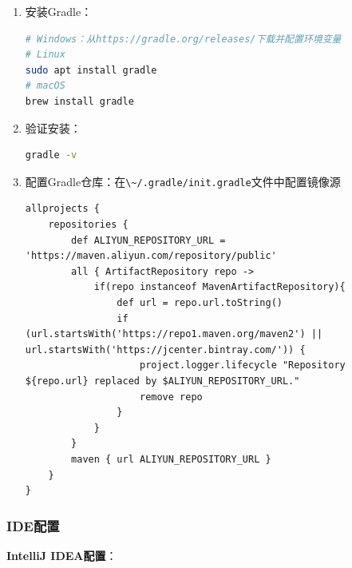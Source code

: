 \begin{enumerate}
\def\labelenumi{\arabic{enumi}.}
\item
  安装Gradle：

\begin{lstlisting}[language=bash]
# Windows：从https://gradle.org/releases/下载并配置环境变量
# Linux
sudo apt install gradle
# macOS
brew install gradle
\end{lstlisting}
\item
  验证安装：

\begin{lstlisting}[language=bash]
gradle -v
\end{lstlisting}
\item
  配置Gradle仓库：在\passthrough{\lstinline!\~/.gradle/init.gradle!}文件中配置镜像源

\begin{lstlisting}
allprojects {
    repositories {
        def ALIYUN_REPOSITORY_URL = 'https://maven.aliyun.com/repository/public'
        all { ArtifactRepository repo ->
            if(repo instanceof MavenArtifactRepository){
                def url = repo.url.toString()
                if (url.startsWith('https://repo1.maven.org/maven2') || url.startsWith('https://jcenter.bintray.com/')) {
                    project.logger.lifecycle "Repository ${repo.url} replaced by $ALIYUN_REPOSITORY_URL."
                    remove repo
                }
            }
        }
        maven { url ALIYUN_REPOSITORY_URL }
    }
}
\end{lstlisting}
\end{enumerate}

\subsubsection{IDE配置}\label{ideux914dux7f6e}

\textbf{IntelliJ IDEA配置}：


